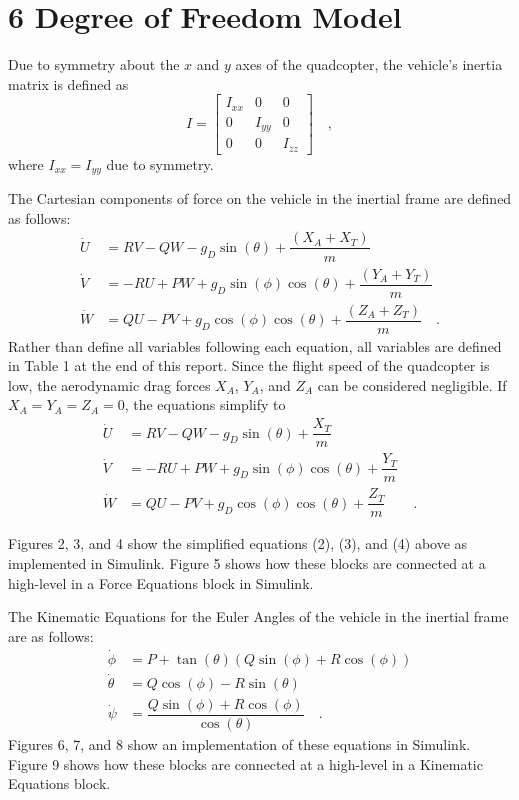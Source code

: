 \section*{6 Degree of Freedom Model}

Due to symmetry about the $x$ and $y$ axes of the quadcopter, the vehicle's inertia matrix is defined as
\begin{equation}
    I = 
    \begin{bmatrix}
        I_{xx} & 0 & 0 \\
        0 & I_{yy} & 0 \\
        0 & 0 & I_{zz}
    \end{bmatrix} \quad ,
\end{equation} where $I_{xx} = I_{yy}$ due to symmetry.

The Cartesian components of force on the vehicle in the inertial frame are defined as follows:
\begin{align*}
    \dot{U} &= RV - QW - g_D\sin(\theta) + \dfrac{(X_A + X_T)}{m} \\
    \dot{V} &= -RU + PW + g_D\sin(\phi)\cos(\theta) + \dfrac{(Y_A + Y_T)}{m} \\
    \dot{W} &= QU - PV + g_D\cos(\phi)\cos(\theta) + \dfrac{(Z_A + Z_T)}{m} \quad .
\end{align*}
Rather than define all variables following each equation, all variables are defined in Table 1 at the end of this report. Since the flight speed of the quadcopter is low, the aerodynamic drag forces $X_A$, $Y_A$, and $Z_A$ can be considered negligible. If $X_A = Y_A = Z_A = 0$, the equations simplify to
\begin{align}
    \dot{U} &= RV - QW - g_D\sin(\theta) + \dfrac{X_T}{m} \\
    \dot{V} &= -RU + PW + g_D\sin(\phi)\cos(\theta) + \dfrac{Y_T}{m} \\
    \dot{W} &= QU - PV + g_D\cos(\phi)\cos(\theta) + \dfrac{Z_T}{m} \quad\quad .
\end{align}

Figures 2, 3, and 4 show the simplified equations (2), (3), and (4) above as implemented in Simulink. Figure 5 shows how these blocks are connected at a high-level in a Force Equations block in Simulink.

The Kinematic Equations for the Euler Angles of the vehicle in the inertial frame are as follows:
\begin{align}
    \dot{\phi} &= P + \tan(\theta)(Q\sin(\phi) + R\cos(\phi)) \\
    \dot{\theta} &= Q\cos(\phi) - R\sin(\theta) \\
    \dot{\psi} &= \dfrac{Q\sin(\phi) + R\cos(\phi)}{\cos(\theta)} \quad .
\end{align}
Figures 6, 7, and 8 show an implementation of these equations in Simulink. Figure 9 shows how these blocks are connected at a high-level in a Kinematic Equations block.

